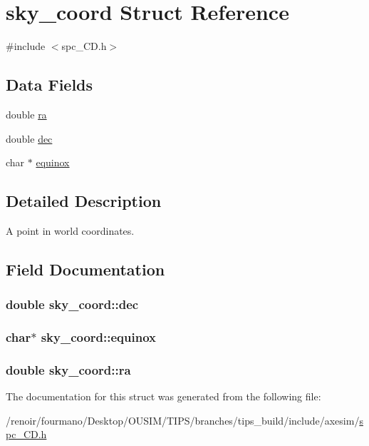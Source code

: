 \hypertarget{structsky__coord}{
\section{sky\_\-coord Struct Reference}
\label{structsky__coord}
}


{\ttfamily \#include $<$spc\_\-CD.h$>$}\subsection*{Data Fields}
\begin{DoxyCompactItemize}
\item 
double \hyperlink{structsky__coord_aec601540bafa93c27df796833cef0a4a}{ra}
\item 
double \hyperlink{structsky__coord_adf4362b3c3798af082500ff300f57d89}{dec}
\item 
char $\ast$ \hyperlink{structsky__coord_aef8bca4f05b6c43b045830e2bb893978}{equinox}
\end{DoxyCompactItemize}


\subsection{Detailed Description}
A point in world coordinates. 

\subsection{Field Documentation}
\hypertarget{structsky__coord_adf4362b3c3798af082500ff300f57d89}{
\subsubsection[{dec}]{\setlength{\rightskip}{0pt plus 5cm}double {\bf sky\_\-coord::dec}}}
\label{structsky__coord_adf4362b3c3798af082500ff300f57d89}
\hypertarget{structsky__coord_aef8bca4f05b6c43b045830e2bb893978}{
\subsubsection[{equinox}]{\setlength{\rightskip}{0pt plus 5cm}char$\ast$ {\bf sky\_\-coord::equinox}}}
\label{structsky__coord_aef8bca4f05b6c43b045830e2bb893978}
\hypertarget{structsky__coord_aec601540bafa93c27df796833cef0a4a}{
\subsubsection[{ra}]{\setlength{\rightskip}{0pt plus 5cm}double {\bf sky\_\-coord::ra}}}
\label{structsky__coord_aec601540bafa93c27df796833cef0a4a}


The documentation for this struct was generated from the following file:\begin{DoxyCompactItemize}
\item 
/renoir/fourmano/Desktop/OUSIM/TIPS/branches/tips\_\-build/include/axesim/\hyperlink{spc__CD_8h}{spc\_\-CD.h}\end{DoxyCompactItemize}
